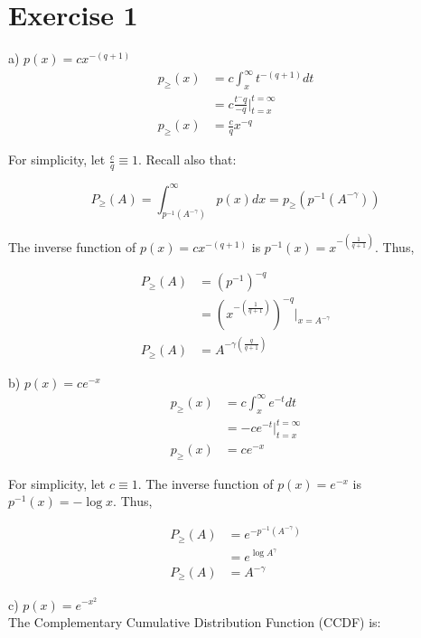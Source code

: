 \documentclass{article}
\begin{document}
\section{Exercise 1}

a) $p(x) = cx^{-(q+1)}$ \\

\begin{align}
p_{\geq}(x) &= c \int_{x}^{\infty} t^{-(q+1)}dt \\
&= c \frac{t^-q}{-q} \vert_{t=x}^{t=\infty} \\
p_{\geq}(x) &= \frac{c}{q} x^{-q}
\end{align}

For simplicity, let $\frac{c}{q}\equiv1$. Recall also that:

\begin{equation}
P_{\geq}(A) = \int_{p^{-1}(A^{-\gamma})}^{\infty} p(x) dx = p_{\geq}(p^{-1}(A^{-\gamma}))
 \end{equation}
 
 The inverse function of $p(x) = cx^{-(q+1)}$ is $p^{-1}(x) = x^{-(\frac{1}{q+1})}$. Thus,
 
 \begin{align}
 P_{\geq}(A) &= (p^{-1})^{-q} \\
 &= (x^{-(\frac{1}{q+1})})^{-q} \vert_{x=A^{-\gamma}} \\
 P_{\geq}(A) &= A^{-\gamma(\frac{q}{q+1})} 
 \end{align}
 
 b) $p(x) = ce^{-x}$ \\
 
 \begin{align}
p_{\geq}(x) &= c \int_{x}^{\infty} e^{-t}dt \\
&= -c e^{-t} \vert_{t=x}^{t=\infty} \\
p_{\geq}(x) &= ce^{-x}
\end{align}

For simplicity, let $c \equiv 1$. The inverse function of $p(x) = e^{-x}$ is $p^{-1}(x) = -\log{x}$. Thus, 

\begin{align}
P_{\geq}(A) &= e^{-p^{-1}(A^{-\gamma})} \\
&= e^{\log{A^\gamma}} \\
P_{\geq}(A) &= A^{-\gamma}
\end{align}

c) $p(x) = e^{-x^2}$ \\

The Complementary Cumulative Distribution Function (CCDF) is:
\end{document}

